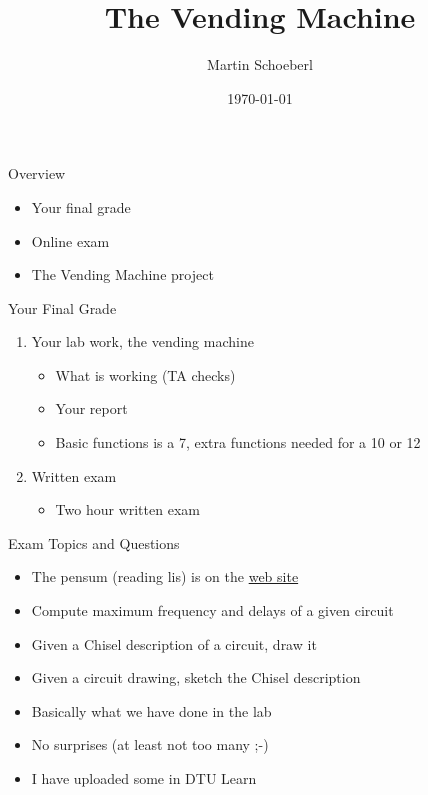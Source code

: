 

\newif\ifbook


\title{The Vending Machine}
\author{Martin Schoeberl}
\date{\today}



\begin{frame}
\titlepage
\end{frame}



\begin{frame}[fragile]{Overview}
\begin{itemize}
\item Your final grade
\item Online exam
\item The Vending Machine project
\end{itemize}
\end{frame}

\begin{frame}[fragile]{Your Final Grade}
\begin{enumerate}
\item Your lab work, the vending machine
\begin{itemize}
\item What is working (TA checks)
\item Your report
\item Basic functions is a 7, extra functions needed for a 10 or 12
\end{itemize}
\item Written exam
\begin{itemize}
\item Two hour written exam
\end{itemize}
\end{enumerate}
\end{frame}

\begin{frame}[fragile]{Exam Topics and Questions}
\begin{itemize}
\item The pensum (reading lis) is on the \href{http://www2.imm.dtu.dk/courses/02139/}{web site}
\item Compute maximum frequency and delays of a given circuit
\item Given a Chisel description of a circuit, draw it
\item Given a circuit drawing, sketch the Chisel description
\item Basically what we have done in the lab
\item No surprises (at least not too many ;-)
\item I have uploaded some in DTU Learn
\end{itemize}
\end{frame}



